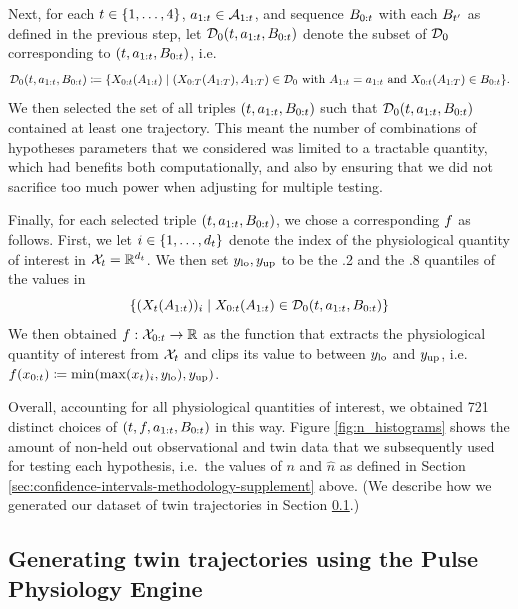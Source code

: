 Next, for each $t \in \{1, \ldots, 4\}$, $a_{1:t} \in \mathcal{A}_{1:t}$, and sequence $B_{0:t}$ with each $B_{t'}$ as defined in the previous step, let $\mathcal{D}_0(t, a_{1:t}, B_{0:t})$ denote the subset of $\mathcal{D}_0$ corresponding to $(t, a_{1:t}, B_{0:t})$, i.e.\
\[
    \mathcal{D}_0(t, a_{1:t}, B_{0:t}) \coloneqq \{X_{0:t}(A_{1:t}) \mid \text{$(X_{0:T}(A_{1:T}), A_{1:T}) \in \mathcal{D}_0$ with $A_{1:t} = a_{1:t}$ and $X_{0:t}(A_{1:T}) \in B_{0:t}$}\}.
\]
We then selected the set of all triples $(t, a_{1:t}, B_{0:t})$ such that $\mathcal{D}_0(t, a_{1:t}, B_{0:t})$ contained at least one trajectory.
This meant the number of combinations of hypotheses parameters that we considered was limited to a tractable quantity, which had benefits both computationally, and also by ensuring that we did not sacrifice too much power when adjusting for multiple testing.

Finally, for each selected triple $(t, a_{1:t}, B_{0:t})$, we chose a corresponding $f$ as follows.
First, we let $i \in \{1, \ldots, d_t\}$ denote the index of the physiological quantity of interest in $\mathcal{X}_t = \mathbb{R}^{d_t}$.
We then set $y_{\mathrm{lo}}, y_{\mathrm{up}}$ to be the .2 and the .8 quantiles of the values in
\[
    \{(X_t(A_{1:t}))_i \mid X_{0:t}(A_{1:t}) \in \mathcal{D}_0(t, a_{1:t}, B_{0:t})\}
\]
We then obtained $f : \mathcal{X}_{0:t} \to \mathbb{R}$ as the function that extracts the physiological quantity of interest from $\mathcal{X}_t$ and clips its value to between $y_{\mathrm{lo}}$ and $y_{\mathrm{up}}$, i.e.\ $f(x_{0:t}) \coloneqq \min(\max(x_{t})_{i}, y_{\mathrm{lo}}), y_{\mathrm{up}})$.

Overall, accounting for all physiological quantities of interest, we obtained 721 distinct choices of $(t, f, a_{1:t}, B_{0:t})$ in this way.
Figure \ref{fig:n_histograms} shows the amount of non-held out observational and twin data that we subsequently used for testing each hypothesis, i.e.\ the values of $n$ and $\widehat{n}$ as defined in Section \ref{sec:confidence-intervals-methodology-supplement} above.
(We describe how we generated our dataset of twin trajectories in Section \ref{sec:pulse-trajectories-supplement}.)

\subsection{Generating twin trajectories using the Pulse Physiology Engine}\label{sec:pulse-trajectories-supplement}

